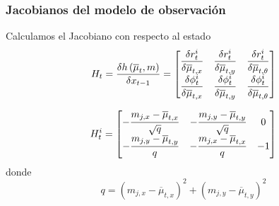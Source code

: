 \begin{frame}
    \frametitle{Jacobianos del modelo de observación}
    Calculamos el Jacobiano con respecto al estado
    \begin{equation*}
        H_{t} = \dfrac{\delta h\left( \overline{\mu}_{t},m \right)}{\delta x_{t-1}} =
        \begin{bmatrix}
            \dfrac{\delta r_{t}^{i}}{\delta \overline{\mu}_{t,x}} & \dfrac{\delta r_{t}^{i}}{\delta \overline{\mu}_{t,y}} & \dfrac{\delta r_{t}^{i}}{\delta \overline{\mu}_{t,\theta}}\\
            \dfrac{\delta \phi_{t}^{i}}{\delta \overline{\mu}_{t,x}} & \dfrac{\delta \phi_{t}^{i}}{\delta \overline{\mu}_{t,y}} & \dfrac{\delta \phi_{t}^{i}}{\delta \overline{\mu}_{t,\theta}}
        \end{bmatrix}
    \end{equation*}
    
    \begin{equation*}
        H_{t}^{i} = 
        \begin{bmatrix}
            -\dfrac{m_{j,x} - \overline{\mu}_{t,x}}{\sqrt{q}} & -\dfrac{m_{j,y} - \overline{\mu}_{t,y}}{\sqrt{q}}  & 0\\
            -\dfrac{m_{j,y} - \overline{\mu}_{t,y}}{q}  & -\dfrac{m_{j,x} - \overline{\mu}_{t,x}}{q}  & -1
        \end{bmatrix}
    \end{equation*}
    donde
    \begin{equation*}
        q = (m_{j,x}-\overline{\mu}_{t,x})^{2} + (m_{j,y}-\overline{\mu}_{t,y})^{2}
    \end{equation*}
\end{frame}

